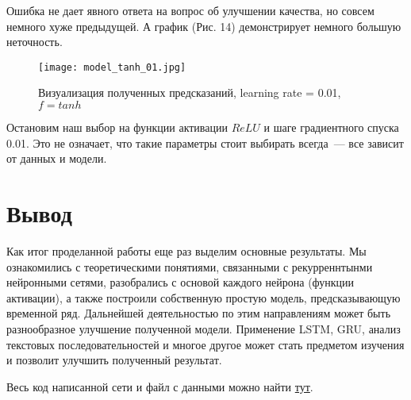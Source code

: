 \documentclass[12pt, a4paper]{article}
\begin{document}
Ошибка не дает явного ответа на вопрос об улучшении качества, но совсем немного хуже предыдущей. А график (Рис. 14) демонстрирует немного большую неточность.

\begin{figure}[ht]
	\noindent\centering
	\texttt{[image: model\_tanh\_01.jpg]}
	\caption{Визуализация полученных предсказаний, learning rate = 0.01, $f = tanh$}
\end{figure}

Остановим наш выбор на функции активации $ReLU$ и шаге градиентного спуска 0.01. Это не означает, что такие параметры стоит выбирать всегда~---  все зависит от данных и модели.

\section{Вывод}

Как итог проделанной работы еще раз выделим основные результаты. Мы ознакомились с теоретическими понятиями, связанными с рекурреннтынми нейронными сетями, разобрались с основой каждого нейрона (функции активации), а также построили собственную простую модель, предсказывающую временной ряд. Дальнейшей деятельностью по этим направлениям может быть разнообразное улучшение полученной модели. Применение LSTM, GRU, анализ текстовых последовательностей и многое другое может стать предметом изучения и позволит улучшить полученный результат.

Весь код написанной сети и файл с данными можно найти \href{https://github.com/maschasap/rnn.git}{тут}.
\newpage

\end{document}
